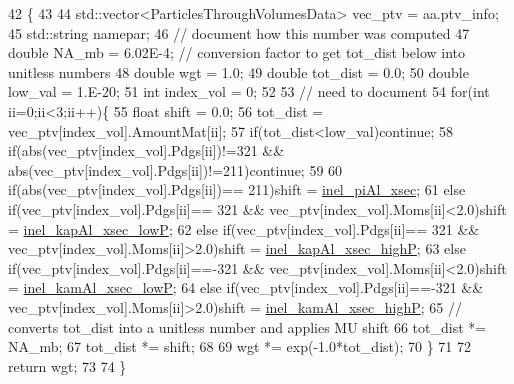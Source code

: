 \begin{DoxyCode}
42                                                                               \{
43      
44     std::vector<ParticlesThroughVolumesData>  vec\_ptv = aa.ptv\_info;
45     std::string namepar;
46     \textcolor{comment}{// document how this number was computed}
47     \textcolor{keywordtype}{double} NA\_mb    = 6.02E-4; \textcolor{comment}{// conversion factor to get tot\_dist below into unitless numbers}
48     \textcolor{keywordtype}{double} wgt      = 1.0;
49     \textcolor{keywordtype}{double} tot\_dist = 0.0;
50     \textcolor{keywordtype}{double} low\_val  = 1.E-20;   
51     \textcolor{keywordtype}{int} index\_vol = 0;
52     
53     \textcolor{comment}{// need to document}
54     \textcolor{keywordflow}{for}(\textcolor{keywordtype}{int} ii=0;ii<3;ii++)\{
55       \textcolor{keywordtype}{float} shift = 0.0;
56       tot\_dist = vec\_ptv[index\_vol].AmountMat[ii];
57       \textcolor{keywordflow}{if}(tot\_dist<low\_val)\textcolor{keywordflow}{continue};
58       \textcolor{keywordflow}{if}(abs(vec\_ptv[index\_vol].Pdgs[ii])!=321 && abs(vec\_ptv[index\_vol].Pdgs[ii])!=211)\textcolor{keywordflow}{continue};
59       
60       \textcolor{keywordflow}{if}(abs(vec\_ptv[index\_vol].Pdgs[ii])== 211)shift = \hyperlink{class_neutrino_flux_reweight_1_1_absorption_i_c_reweighter_a9eb43d6dc37d7d56c5fc63ef04ae0b95}{inel\_piAl\_xsec};
61       \textcolor{keywordflow}{else} \textcolor{keywordflow}{if}(vec\_ptv[index\_vol].Pdgs[ii]== 321 && vec\_ptv[index\_vol].Moms[ii]<2.0)shift = 
      \hyperlink{class_neutrino_flux_reweight_1_1_absorption_i_c_reweighter_ada87b802b0f5a66ffbdae8557c677857}{inel\_kapAl\_xsec\_lowP};
62       \textcolor{keywordflow}{else} \textcolor{keywordflow}{if}(vec\_ptv[index\_vol].Pdgs[ii]== 321 && vec\_ptv[index\_vol].Moms[ii]>2.0)shift = 
      \hyperlink{class_neutrino_flux_reweight_1_1_absorption_i_c_reweighter_a14274987e004a55f88767d9ec22d7c9d}{inel\_kapAl\_xsec\_highP};
63       \textcolor{keywordflow}{else} \textcolor{keywordflow}{if}(vec\_ptv[index\_vol].Pdgs[ii]==-321 && vec\_ptv[index\_vol].Moms[ii]<2.0)shift = 
      \hyperlink{class_neutrino_flux_reweight_1_1_absorption_i_c_reweighter_a0b3707268a0569123e3d7116d35d63d6}{inel\_kamAl\_xsec\_lowP};
64       \textcolor{keywordflow}{else} \textcolor{keywordflow}{if}(vec\_ptv[index\_vol].Pdgs[ii]==-321 && vec\_ptv[index\_vol].Moms[ii]>2.0)shift = 
      \hyperlink{class_neutrino_flux_reweight_1_1_absorption_i_c_reweighter_a216cbaf9abd19f100ed5444b7a11011d}{inel\_kamAl\_xsec\_highP};
65       \textcolor{comment}{// converts tot\_dist into a unitless number and applies MU shift}
66       tot\_dist *= NA\_mb;
67       tot\_dist *= shift;
68       
69       wgt *= exp(-1.0*tot\_dist);   
70     \}
71     
72     \textcolor{keywordflow}{return} wgt;
73     
74   \}
\end{DoxyCode}
